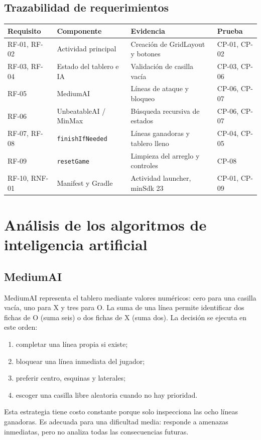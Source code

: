 \documentclass[stu,a4paper,12pt,floatsintext]{apa7}
\begin{document}
\subsection{Trazabilidad de requerimientos}
\begin{longtable}{p{}p{}p{}p{}}
\toprule
\textbf{Requisito} & \textbf{Componente} & \textbf{Evidencia} & \textbf{Prueba}\\
\midrule
RF-01, RF-02 & Actividad principal & Creación de GridLayout y botones & CP-01, CP-02\\
RF-03, RF-04 & Estado del tablero e IA & Validación de casilla vacía & CP-03, CP-06\\
RF-05 & MediumAI & Líneas de ataque y bloqueo & CP-06, CP-07\\
RF-06 & UnbeatableAI / MinMax & Búsqueda recursiva de estados & CP-06, CP-07\\
RF-07, RF-08 & \texttt{finishIfNeeded} & Líneas ganadoras y tablero lleno & CP-04, CP-05\\
RF-09 & \texttt{resetGame} & Limpieza del arreglo y controles & CP-08\\
RF-10, RNF-01 & Manifest y Gradle & Actividad launcher, minSdk 23 & CP-01, CP-09\\
\bottomrule
\end{longtable}

\section{Análisis de los algoritmos de inteligencia artificial}
\subsection{MediumAI}
MediumAI representa el tablero mediante valores numéricos: cero para una
casilla vacía, uno para X y tres para O. La suma de una línea permite
identificar dos fichas de O (suma seis) o dos fichas de X (suma dos). La
decisión se ejecuta en este orden:
\begin{enumerate}
  \item completar una línea propia si existe;
  \item bloquear una línea inmediata del jugador;
  \item preferir centro, esquinas y laterales;
  \item escoger una casilla libre aleatoria cuando no hay prioridad.
\end{enumerate}
Esta estrategia tiene costo constante porque solo inspecciona las ocho líneas
ganadoras. Es adecuada para una dificultad media: responde a amenazas
inmediatas, pero no analiza todas las consecuencias futuras.
\end{document}
